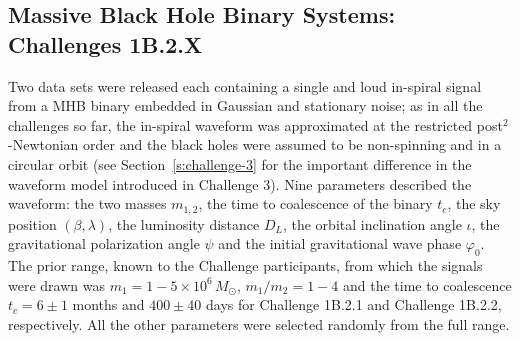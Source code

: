 \documentclass{iopart}
\begin{document}
\subsection{Massive Black Hole Binary Systems: Challenges 1B.2.X}

Two data sets were released each containing a single and loud in-spiral signal from a MHB binary embedded in Gaussian and stationary noise; as in all the challenges so far, the in-spiral waveform was approximated at the restricted post$^2$-Newtonian order and the black holes were assumed to be non-spinning and in a circular orbit (see Section~\ref{s:challenge-3} for the important difference in the waveform model introduced in Challenge 3). Nine parameters described the waveform: the two masses $m_{1,2}$, the time to coalescence of the binary $t_c$, the sky position $(\beta,\lambda)$, the luminosity distance $D_L$, the orbital inclination angle $\iota$, the gravitational polarization angle $\psi$ and the initial gravitational wave phase $\varphi_0$.  The prior range, known to the Challenge participants, from which the signals were drawn was $m_1 = 1-5 \times 10^6\,M_{\odot}$, $m_1/m_2 = 1-4$ and the time to coalescence $t_c = 6\pm 1$ months and $400\pm40$ days for Challenge 1B.2.1 and Challenge 1B.2.2, respectively. All the other parameters were selected randomly from the full range.
\end{document}
